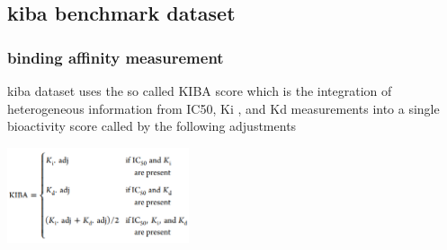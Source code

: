 \documentclass[11pt, a4paper]{article}
\begin{document}
    \subsection{kiba benchmark dataset}
        \subsubsection{binding affinity measurement}
            kiba dataset uses the so called KIBA score which is the integration of heterogeneous information from IC50, Ki , and Kd measurements into a single bioactivity score called by the 
            following adjustments
                \begin{center}
                    \includegraphics[width=0.4\textwidth]{kiba/kiba adjustments.png}
                \end{center}
\end{document}

